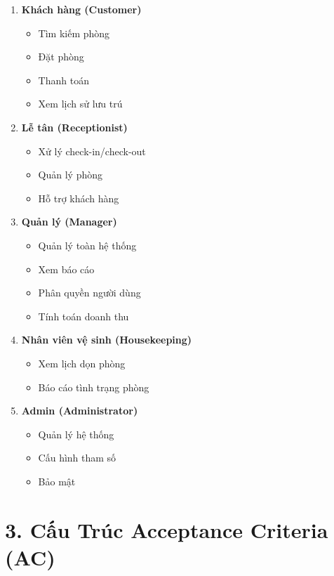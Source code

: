 \documentclass[12pt, a4paper]{report}
\begin{document}
\begin{enumerate}
    \item \textbf{Khách hàng (Customer)}
    \begin{itemize}
        \item Tìm kiếm phòng
        \item Đặt phòng
        \item Thanh toán
        \item Xem lịch sử lưu trú
    \end{itemize}
    
    \item \textbf{Lễ tân (Receptionist)}
    \begin{itemize}
        \item Xử lý check-in/check-out
        \item Quản lý phòng
        \item Hỗ trợ khách hàng
    \end{itemize}
    
    \item \textbf{Quản lý (Manager)}
    \begin{itemize}
        \item Quản lý toàn hệ thống
        \item Xem báo cáo
        \item Phân quyền người dùng
        \item Tính toán doanh thu
    \end{itemize}
    
    \item \textbf{Nhân viên vệ sinh (Housekeeping)}
    \begin{itemize}
        \item Xem lịch dọn phòng
        \item Báo cáo tình trạng phòng
    \end{itemize}
    
    \item \textbf{Admin (Administrator)}
    \begin{itemize}
        \item Quản lý hệ thống
        \item Cấu hình tham số
        \item Bảo mật
    \end{itemize}
\end{enumerate}

\section{3. Cấu Trúc Acceptance Criteria (AC)}
\end{document}
